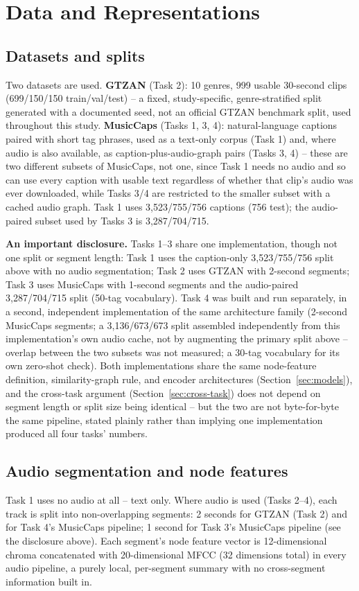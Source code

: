 \section{Data and Representations}\label{sec:data}

\subsection{Datasets and splits}
Two datasets are used. \textbf{GTZAN} \cite{tzanetakis2002gtzan} (Task 2): 10 genres, 999
usable 30-second clips (699/150/150 train/val/test) -- a fixed, study-specific, genre-stratified
split generated with a documented seed, not an official GTZAN benchmark split, used
throughout this study.
\textbf{MusicCaps} \cite{agostinelli2023musiclm} (Tasks 1, 3, 4): natural-language captions
paired with short tag phrases, used as a text-only corpus (Task 1) and, where audio is also
available, as caption-plus-audio-graph pairs
(Tasks 3, 4) -- these are two different subsets of MusicCaps, not one, since Task 1 needs no
audio and so can use every caption with usable text regardless of whether that clip's audio
was ever downloaded, while Tasks 3/4 are restricted to the smaller subset with a cached audio
graph. Task 1 uses 3,523/755/756 captions (756 test); the audio-paired subset used by Tasks
3 is 3,287/704/715.

\textbf{An important disclosure.} Tasks 1--3 share one implementation, though not one split
or segment length: Task 1 uses the caption-only 3,523/755/756 split above with no audio
segmentation; Task 2 uses GTZAN with 2-second segments; Task 3 uses MusicCaps with 1-second
segments and the audio-paired 3,287/704/715 split (50-tag vocabulary). Task 4 was built and
run separately, in a second, independent implementation of the same architecture family
(2-second MusicCaps segments; a 3,136/673/673 split assembled independently from this
implementation's own audio cache, not by augmenting the primary split above -- overlap
between the two subsets was not measured; a 30-tag vocabulary for its own zero-shot check).
Both implementations share the same node-feature definition, similarity-graph rule, and
encoder architectures (Section~\ref{sec:models}), and the cross-task argument
(Section~\ref{sec:cross-task}) does not depend on segment length or split size being
identical -- but the two are not byte-for-byte the same pipeline, stated plainly rather than
implying one implementation produced all four tasks' numbers.

\subsection{Audio segmentation and node features}
Task 1 uses no audio at all -- text only. Where audio is used (Tasks 2--4), each track is
split into non-overlapping segments: 2 seconds for GTZAN (Task 2) and for Task 4's MusicCaps
pipeline; 1 second for Task 3's MusicCaps pipeline (see the disclosure above). Each segment's
node feature vector is 12-dimensional chroma concatenated with 20-dimensional MFCC (32
dimensions total) in every audio pipeline, a purely local, per-segment summary with no
cross-segment information built in.

